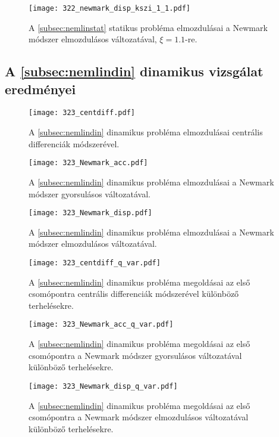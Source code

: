 \begin{figure}[H]
\centering
\texttt{[image: 322\_newmark\_disp\_kszi\_1\_1.pdf]}
\caption{A \ref{subsec:nemlinstat} statikus probléma elmozdulásai a Newmark módszer elmozdulásos változatával, $\xi = 1.1$-re.}
\label{fig:függ322_newmark_disp_1_1}
\end{figure}


\subsection{A \ref{subsec:nemlindin} dinamikus vizsgálat eredményei}\label{sec:függ 323}


\begin{figure}[H]
\centering
\texttt{[image: 323\_centdiff.pdf]}
\caption{A \ref{subsec:nemlindin} dinamikus probléma elmozdulásai centrális differenciák módszerével.}
\label{fig:függ323_centdiff}
\end{figure}

\begin{figure}[H]
\centering
\texttt{[image: 323\_Newmark\_acc.pdf]}
\caption{A \ref{subsec:nemlindin} dinamikus probléma elmozdulásai a Newmark módszer gyorsulásos változatával.}
\label{fig:függ323_newmark_acc}
\end{figure}

\begin{figure}[H]
\centering
\texttt{[image: 323\_Newmark\_disp.pdf]}
\caption{A \ref{subsec:nemlindin} dinamikus probléma elmozdulásai a Newmark módszer elmozdulásos változatával.}
\label{fig:függ323_newmark_disp}
\end{figure}


\begin{figure}[H]
\centering
\texttt{[image: 323\_centdiff\_q\_var.pdf]}
\caption{A \ref{subsec:nemlindin} dinamikus probléma megoldásai az első csomópontra  centrális differenciák módszerével különböző terhelésekre.}
\label{fig:függ323_newmark_disp_q_var_1}
\end{figure}

\begin{figure}[H]
\centering
\texttt{[image: 323\_Newmark\_acc\_q\_var.pdf]}
\caption{A \ref{subsec:nemlindin} dinamikus probléma megoldásai az első csomópontra a Newmark módszer gyorsulásos változatával különböző terhelésekre.}
\label{fig:függ323_newmark_disp_q_var_1}
\end{figure}

\begin{figure}[H]
\centering
\texttt{[image: 323\_Newmark\_disp\_q\_var.pdf]}
\caption{A \ref{subsec:nemlindin} dinamikus probléma megoldásai az első csomópontra a Newmark módszer elmozdulásos változatával különböző terhelésekre.}
\label{fig:függ323_newmark_disp_q_var_1}
\end{figure}



